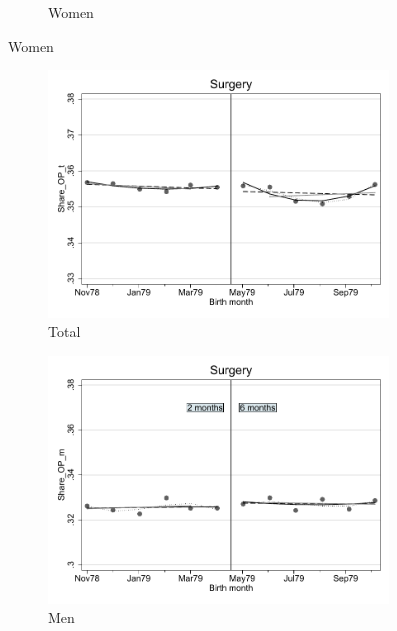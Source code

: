 \documentclass[a4paper ]{article}
\begin{document}
\begin{figure}[h!]
\begin{subfigure}[t]{0.31\textwidth}
		\caption{Women}
	\end{subfigure}
\end{figure}

\newpage
\begin{figure}[h]
	\centering
	\begin{subfigure}[t]{0.31\textwidth}
		\centering
		\includegraphics[width=0.99\textwidth]{R1_RD_Share_OP_t_fits}
		\caption{Total}		
	\end{subfigure}
	\begin{subfigure}[t]{0.31\textwidth}
		\centering
		\includegraphics[width=0.99\textwidth]{R1_RD_Share_OP_m_fits}
		\caption{Men}		
	\end{subfigure}
	\quad
	\begin{subfigure}[t]{0.31\textwidth}

\end{subfigure}
\end{figure}
\end{document}
